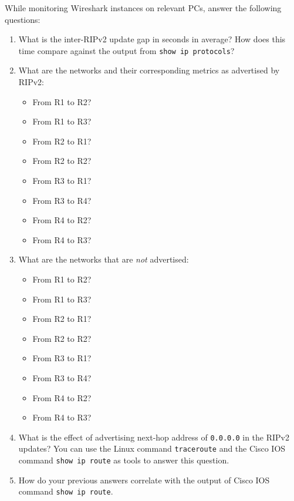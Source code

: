 \documentclass[pdftex,12pt,a4paper]{article}
\begin{document}
            While monitoring Wireshark instances on relevant PCs, answer
            the following questions:
            \begin{enumerate}
                \item What is the inter-RIPv2 update gap in seconds in average? How
                    does this time compare against the output from \texttt{show
                    ip protocols}?
                \item What are the networks and their
                    corresponding metrics as advertised by RIPv2:
                    \begin{itemize}
                        \item From R1 to R2?
                        \item From R1 to R3?
                        \item From R2 to R1?
                        \item From R2 to R2?
                        \item From R3 to R1?
                        \item From R3 to R4?
                        \item From R4 to R2?
                        \item From R4 to R3?
                    \end{itemize}
                \item What are the networks that are \emph{not} advertised:
                    \begin{itemize}
                        \item From R1 to R2?
                        \item From R1 to R3?
                        \item From R2 to R1?
                        \item From R2 to R2?
                        \item From R3 to R1?
                        \item From R3 to R4?
                        \item From R4 to R2?
                        \item From R4 to R3?
                    \end{itemize}
                \item What is the effect of advertising next-hop address of
                    \texttt{0.0.0.0} in the RIPv2 updates? You can use the
                    Linux command \texttt{traceroute} and the Cisco IOS command
                    \texttt{show ip route} as tools to answer this question.
                \item How do your previous answers correlate with the output of
                    Cisco IOS command \texttt{show ip route}.
            \end{enumerate}
\end{document}

